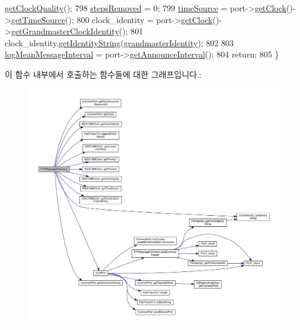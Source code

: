 \begin{DoxyCode}
      \hyperlink{class_i_e_e_e1588_clock_abb0ea8615a45a32ebc4e7ca52c0d3bf1}{getClockQuality}();
798     \hyperlink{class_p_t_p_message_announce_ab24df4cccbede4b07586878ef0d47395}{stepsRemoved} = 0;
799     \hyperlink{class_p_t_p_message_announce_a56fd97f48cb931b2450032650f82ef17}{timeSource} = port->\hyperlink{class_common_port_ab8e59ecfb51ec14e166bc8bfc872b1ef}{getClock}()->\hyperlink{class_i_e_e_e1588_clock_a28eab05cb1e8228f86938ffd8a2ef5ef}{getTimeSource}();
800     clock\_identity = port->\hyperlink{class_common_port_ab8e59ecfb51ec14e166bc8bfc872b1ef}{getClock}()->\hyperlink{class_i_e_e_e1588_clock_ac99ffb4b0da93125841bedebf8f4369b}{getGrandmasterClockIdentity}();
801     clock\_identity.\hyperlink{class_clock_identity_a340cfc06879a22b087f117121c347b56}{getIdentityString}(\hyperlink{class_p_t_p_message_announce_aac45d13272e7f5bd9b06d2bf44c012af}{grandmasterIdentity});
802 
803     \hyperlink{class_p_t_p_message_common_a2f897c329a52f79528d1b1248254dd1b}{logMeanMessageInterval} = port->\hyperlink{class_common_port_a7aa1a5fddf7129f600c97c018087b7b8}{getAnnounceInterval}();
804     \textcolor{keywordflow}{return};
805 \}
\end{DoxyCode}


이 함수 내부에서 호출하는 함수들에 대한 그래프입니다.\+:
\nopagebreak
\begin{figure}[H]
\begin{center}
\leavevmode
\includegraphics[width=350pt]{class_p_t_p_message_announce_af0e7e6a6295101f339077c83ae7a5cba_cgraph}
\end{center}
\end{figure}


